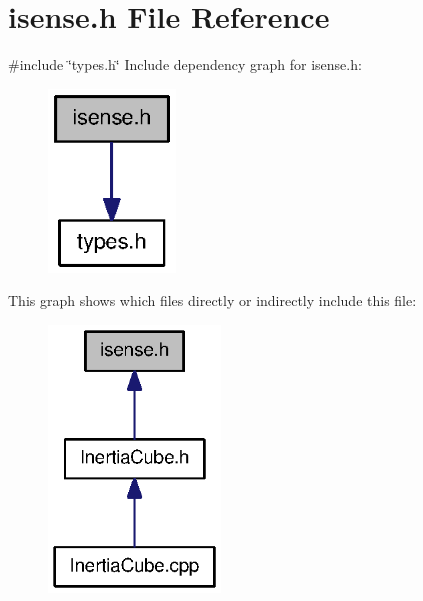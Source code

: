 \section{isense.\-h \-File \-Reference}
\label{isense_8h}
{\ttfamily \#include \char`\"{}types.\-h\char`\"{}}\*
\-Include dependency graph for isense.\-h\-:
\nopagebreak
\begin{figure}[H]
\begin{center}
\leavevmode
\includegraphics[width=96pt]{isense_8h__incl}
\end{center}
\end{figure}
\-This graph shows which files directly or indirectly include this file\-:
\nopagebreak
\begin{figure}[H]
\begin{center}
\leavevmode
\includegraphics[width=130pt]{isense_8h__dep__incl}
\end{center}
\end{figure}
